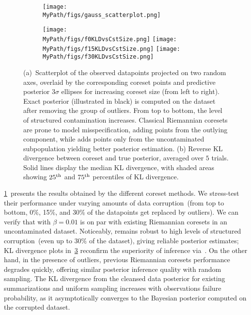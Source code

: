 \begin{figure}[t!]
	\centering 
	\begin{subfigure}[b]{0.9\textwidth} 
		\texttt{[image: \\MyPath/figs/gauss\_scatterplot.png]}
		\caption{\label{fig:gaussian_coreset_points}}
	\end{subfigure}
	\hfill\qquad
	\begin{subfigure}[b]{0.9\textwidth} 
		\centering
		\texttt{[image: \\MyPath/figs/f0KLDvsCstSize.png]}
		\centering
		\hfill
		\texttt{[image: \\MyPath/figs/f15KLDvsCstSize.png]}
		\centering
		\hfill
		\texttt{[image: \\MyPath/figs/f30KLDvsCstSize.png]}
		\caption{\label{fig:gauss_kld}}
	\end{subfigure}	
	\centering
	\caption{(a)~Scatterplot of the observed datapoints projected on two random axes, overlaid by the corresponding coreset points and predictive posterior $3\sigma$ ellipses for increasing coreset size (from left to right). Exact posterior (illustrated in black) is computed on the dataset after removing the group of outliers. From top to bottom, the level of structured contamination increases. Classical Riemannian coresets are prone to model misspecification, adding points from the outlying component, while \bcores{} adds points only from the uncontaminated subpopulation yielding better posterior estimation. (b) Reverse KL divergence between coreset and true posterior, averaged over $5$ trials. Solid lines display the median KL divergence, with shaded areas showing $25\textsuperscript{th}$ and $75\textsuperscript{th}$ percentiles of KL divergence.}
\end{figure}


\cref{fig:gaussian_coreset_points}~presents the results obtained by the different coreset methods. We stress-test their performance under varying amounts of data corruption~(from top to bottom, 0\%, 15\%, and 30\% of the datapoints get replaced by outliers). We can verify that \bcores{} with $\beta=0.01$ is on par with existing Riemannian coresets in an uncontaminated dataset. Noticeably, \bcores{} remains robust to high levels of structured corruption~(even up to $30\%$ of the dataset), giving reliable posterior estimates; KL divergence plots in~\cref{fig:gauss_kld} reconfirm the superiority of inference via~\bcores{}. On the other hand, in the presence of outliers, previous Riemannian coresets performance degrades quickly, offering similar posterior inference quality with random sampling. The KL divergence from the cleansed data posterior for existing summarizations and uniform sampling increases with observations failure probability, as it asymptotically converges to the Bayesian posterior computed on the corrupted dataset. 

